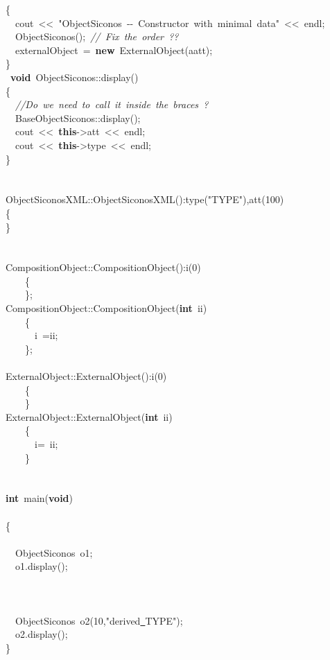 {\{\\
\ \ cout\ <{}<{}\ "{}ObjectSiconos\ -{}-{}\ Constructor\ with\ minimal\ data"{}\ <{}<{}\ endl;\\
\ \ ObjectSiconos();\ \textsl{//\ Fix\ the\ order\ ??}\\
\ \ externalObject\ =\ \textbf{new}\ ExternalObject(aatt);\\
\}\\
\ \textbf{void}\ ObjectSiconos::display()\\
\{\\
\ \ \textsl{//Do\ we\ need\ to\ call\ it\ inside\ the\ braces\ ?}\\
\ \ BaseObjectSiconos::display();\ \\
\ \ cout\ <{}<{}\ \textbf{this}-{}>{}att\ <{}<{}\ endl;\\
\ \ cout\ <{}<{}\ \textbf{this}-{}>{}type\ <{}<{}\ endl;\\
\}\\
\ \\
\ \\
ObjectSiconosXML::ObjectSiconosXML():type("{}TYPE"{}),att(100)\\
\{\\
\}\\
\ \\
\ \\
CompositionObject::CompositionObject():i(0)\\
\ \ \ \ \{\\
\ \ \ \ \};\\
CompositionObject::CompositionObject(\textbf{int}\ ii)\\
\ \ \ \ \{\\
\ \ \ \ \ \ i\ =ii;\\
\ \ \ \ \};\\
\ \\
ExternalObject::ExternalObject():i(0)\\
\ \ \ \ \{\\
\ \ \ \ \}\\
ExternalObject::ExternalObject(\textbf{int}\ ii)\\
\ \ \ \ \{\\
\ \ \ \ \ \ i=\ ii;\\
\ \ \ \ \}\\
\ \\
\ \\
\textbf{int}\ main(\textbf{void})\\
\ \\
\{\\
\ \\
\ \ ObjectSiconos\ o1;\\
\ \ o1.display();\\
\ \ \\
\ \\
\ \\
\ \ ObjectSiconos\ o2(10,"{}derived\underline\ TYPE"{});\\
\ \ o2.display();\\
\}\\
\ \\
 }
\normalfont\normalsize

